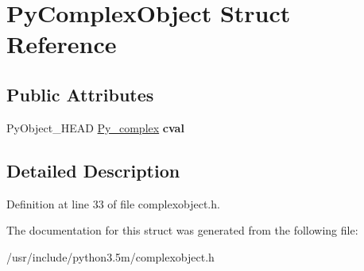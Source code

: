 \hypertarget{structPyComplexObject}{}\section{Py\+Complex\+Object Struct Reference}
\label{structPyComplexObject}
\subsection*{Public Attributes}
\begin{DoxyCompactItemize}
\item 
Py\+Object\+\_\+\+H\+E\+AD \hyperlink{structPy__complex}{Py\+\_\+complex} {\bfseries cval}\hypertarget{structPyComplexObject_ae369afecae8b5bda8a358a8de2826648}{}\label{structPyComplexObject_ae369afecae8b5bda8a358a8de2826648}

\end{DoxyCompactItemize}


\subsection{Detailed Description}


Definition at line 33 of file complexobject.\+h.



The documentation for this struct was generated from the following file\+:\begin{DoxyCompactItemize}
\item 
/usr/include/python3.\+5m/complexobject.\+h\end{DoxyCompactItemize}
